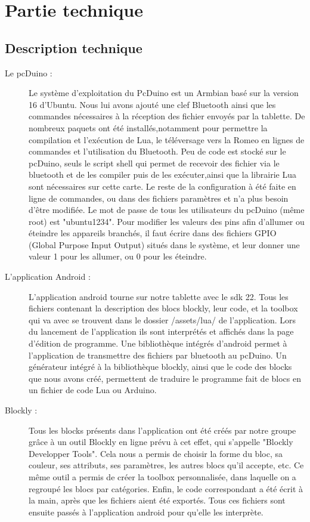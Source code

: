 \documentclass[12pt,francais]{report}
\begin{document}
\chapter*{Partie technique}

\section*{Description technique}

\begin{description}
\item [Le pcDuino :] Le système d'exploitation du PcDuino est un Armbian basé sur la version 16 d'Ubuntu. Nous lui avons ajouté une clef Bluetooth ainsi que les commandes nécessaires à la réception des fichier envoyés par la tablette. De nombreux paquets ont été installés,notamment pour permettre la compilation et l'exécution de Lua, le téléversage vers la Romeo en lignes de commandes et l'utilisation du Bluetooth. 
Peu de code est stocké sur le pcDuino, seuls le script shell qui permet de recevoir des fichier via le bluetooth et de les compiler puis de les exécuter,ainsi que la librairie Lua sont nécessaires sur cette carte. Le reste de la configuration à été faite en ligne de commandes, ou dans des fichiers paramètres et n'a plus besoin d'être modifiée.
Le mot de passe de tous les utilisateurs du pcDuino (même root) est "ubuntu1234".
Pour modifier les valeurs des pins afin d'allumer ou éteindre les appareils branchés, il faut écrire dans des fichiers GPIO (Global Purpose Input Output)\cite{ref26} situés dans le système, et leur donner une valeur 1 pour les allumer, ou 0 pour les éteindre.

\item [L'application Android :] L'application android tourne sur notre tablette avec le sdk 22. 
Tous les fichiers contenant la description des blocs blockly, leur code, et la toolbox qui va avec se trouvent dans le dossier /assets/lua/ de l'application. Lors du lancement de l'application ils sont interprétés et affichés dans la page d'édition de programme. Une bibliothèque intégrés d'android permet à l'application de transmettre des fichiers par bluetooth au pcDuino.
Un générateur intégré à la bibliothèque blockly, ainsi que le code des blocks que nous avons créé, permettent de traduire le programme fait de blocs en un fichier de code Lua ou Arduino.

\item [Blockly :] Tous les blocks présents dans l'application ont été créés par notre groupe grâce à un outil Blockly en ligne prévu à cet effet, qui s'appelle "Blockly Developper Tools"\cite{ref25}. Cela nous a permis de choisir la forme du bloc, sa couleur, ses attributs, ses paramètres, les autres blocs qu'il accepte, etc. Ce même outil a permis de créer la toolbox personnalisée, dans laquelle on a regroupé les blocs par catégories. Enfin, le code correspondant a été écrit à la main, après que les fichiers aient été exportés. Tous ces fichiers sont ensuite passés à l'application android pour qu'elle les interprète.


\end{description}
\end{document}
